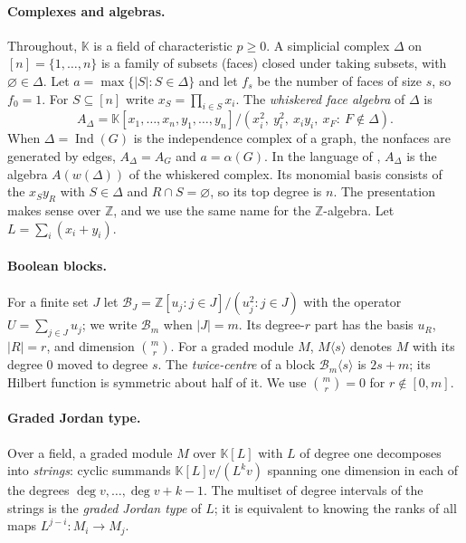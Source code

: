 \documentclass[11pt,a4paper]{article}
\theoremstyle{definition}
\newcommand{\kk}{\mathbb K}
\newcommand{\B}{\mathcal B}
\begin{document}
\paragraph{Complexes and algebras.}
Throughout, $\kk$ is a field of characteristic $p\ge0$. A simplicial complex $\Delta$ on $[n]=\{1,\dots,n\}$ is a family of subsets (faces) closed under taking subsets, with $\varnothing\in\Delta$. Let $a=\max\{|S|:S\in\Delta\}$ and let $f_s$ be the number of faces of size $s$, so $f_0=1$. For $S\subseteq[n]$ write $x_S=\prod_{i\in S}x_i$. The \emph{whiskered face algebra} of $\Delta$ is
\[
 A_\Delta=\kk[x_1,\dots,x_n,y_1,\dots,y_n]/(x_i^2,\ y_i^2,\ x_iy_i,\ x_F:\ F\notin\Delta).
\]
When $\Delta=\operatorname{Ind}(G)$ is the independence complex of a graph, the nonfaces are generated by edges, $A_\Delta=A_G$ and $a=\alpha(G)$. In the language of \cite{HN}, $A_\Delta$ is the algebra $A(w(\Delta))$ of the whiskered complex. Its monomial basis consists of the $x_Sy_R$ with $S\in\Delta$ and $R\cap S=\varnothing$, so its top degree is $n$. The presentation makes sense over $\mathbb Z$, and we use the same name for the $\mathbb Z$-algebra. Let $L=\sum_i(x_i+y_i)$.

\paragraph{Boolean blocks.}
For a finite set $J$ let $\B_J=\mathbb Z[u_j:j\in J]/(u_j^2:j\in J)$ with the operator $U=\sum_{j\in J}u_j$; we write $\B_m$ when $|J|=m$. Its degree-$r$ part has the basis $u_R$, $|R|=r$, and dimension $\binom mr$. For a graded module $M$, $M\langle s\rangle$ denotes $M$ with its degree $0$ moved to degree $s$. The \emph{twice-centre} of a block $\B_m\langle s\rangle$ is $2s+m$; its Hilbert function is symmetric about half of it. We use $\binom mr=0$ for $r\notin[0,m]$.

\paragraph{Graded Jordan type.}
Over a field, a graded module $M$ over $\kk[L]$ with $L$ of degree one decomposes into \emph{strings}: cyclic summands $\kk[L]v/(L^{k}v)$ spanning one dimension in each of the degrees $\deg v,\dots,\deg v+k-1$. The multiset of degree intervals of the strings is the \emph{graded Jordan type} of $L$; it is equivalent to knowing the ranks of all maps $L^{j-i}:M_i\to M_j$.
\end{document}
